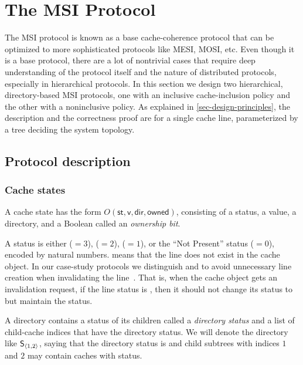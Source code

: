 \section{The MSI Protocol}
\label{sec-msi-protocol}

The MSI protocol is known as a base cache-coherence protocol that can be optimized to more sophisticated protocols like MESI, MOSI, etc.
Even though it is a base protocol, there are a lot of nontrivial cases that require deep understanding of the protocol itself and the nature of distributed protocols, especially in hierarchical protocols.
In this section we design two hierarchical, directory-based MSI protocols, one with an inclusive cache-inclusion policy and the other with a noninclusive policy.
As explained in \autoref{sec-design-principles}, the description and the correctness proof are for a single cache line, parameterized by a tree deciding the system topology.

\subsection{Protocol description}
\label{sec-msi-protocol-desc}

\subsubsection{Cache states}

A cache state has the form $O(\textsf{st}, \textsf{v}, \textsf{dir}, \textsf{owned})$, consisting of a status, a value, a directory, and a Boolean called an \emph{ownership bit}.

A status is either \stM{}($=3$), \stS{}($=2$), \stI{}($=1$), or the ``Not Present'' status (\stNP{}$=0$), encoded by natural numbers.
\stNP{} means that the line does not exist in the cache object.
In our case-study protocols we distinguish \stI{} and \stNP{} to avoid unnecessary line creation when invalidating the line~\cite{ccbook:2020}.
That is, when the cache object gets an invalidation request, if the line status is \stNP{}, then it should not change its status to \stI{} but maintain the \stNP{} status.

A directory contains a status of its children called a \emph{directory status} and a list of child-cache indices that have the directory status.
We will denote the directory like $\textsf{S}{}_{\langle 1, 2 \rangle}$, saying that the directory status is \stS{} and child subtrees with indices $1$ and $2$ may contain caches with \stS{} status.

